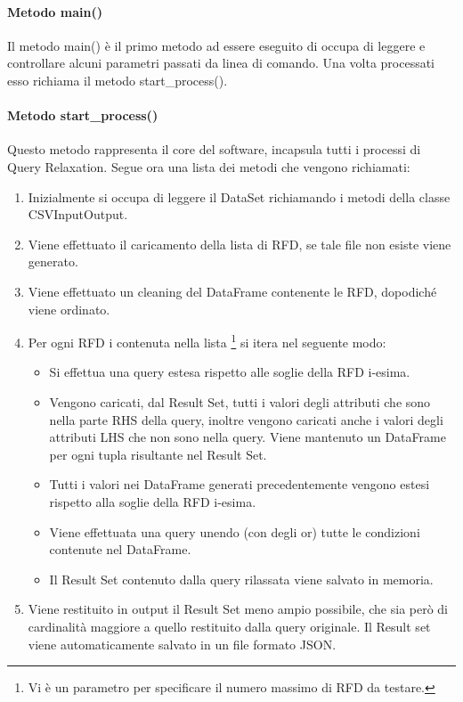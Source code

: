 \paragraph{Metodo main()}
Il metodo main() è il primo metodo ad essere eseguito di occupa di leggere e controllare alcuni parametri passati da linea di comando. Una volta processati esso richiama il metodo start{\_}process().

\paragraph{Metodo start{\_}process()}
Questo metodo rappresenta il core del software, incapsula tutti i processi di Query Relaxation.
Segue ora una lista dei metodi che vengono richiamati:
\begin{enumerate}
    \item Inizialmente si occupa di leggere il DataSet richiamando i metodi della classe CSVInputOutput.
    \item Viene effettuato il caricamento della lista di RFD, se tale file non esiste viene generato.
    \item Viene effettuato un cleaning del DataFrame contenente le RFD, dopodiché viene ordinato.
    \item Per ogni RFD i contenuta nella lista \footnote{Vi è un parametro per specificare il numero massimo di RFD da testare.} si itera nel seguente modo:
    \begin{itemize}
        \item Si effettua una query estesa rispetto alle soglie della RFD i-esima.
        \item Vengono caricati, dal Result Set, tutti i valori degli attributi che sono nella parte RHS della query, inoltre vengono caricati anche i valori degli attributi LHS che non sono nella query. Viene mantenuto un DataFrame per ogni tupla risultante nel Result Set.
        \item Tutti i valori nei DataFrame generati precedentemente vengono estesi rispetto alla soglie della RFD i-esima.
        \item Viene effettuata una query unendo (con degli or) tutte le condizioni contenute nel DataFrame.
        \item Il Result Set contenuto dalla query rilassata viene salvato in memoria.
    \end{itemize}
    \item Viene restituito in output il Result Set meno ampio possibile, che sia però di cardinalità maggiore a quello restituito dalla query originale. Il Result set viene automaticamente salvato in un file formato JSON.
\end{enumerate}


